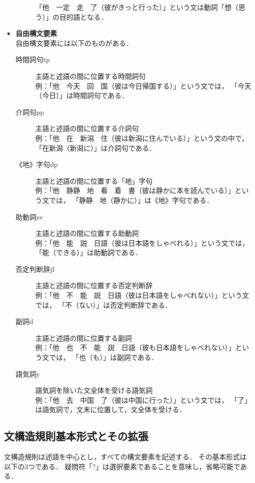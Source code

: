 \documentclass[japanese]{jnlp_1.3a}
\begin{document}
\begin{itemize}
\begin{description}
    「他　一定　走　了（彼がきっと行った）」という文は動詞「想（思う）」の目的語となる．
  \end{description}
\item{\bf 自由構文要素}\\
  自由構文要素には以下のものがある．
  \begin{description}
  \item[時間詞句tp]主語と述語の間に位置する時間詞句\\
    例：「他　今天　回　国（彼は今日帰国する）」という文では，
    「今天（今日）」は時間詞句である．
  \item[介詞句pp]主語と述語の間に位置する介詞句\\
    例：「他　在　新潟　住（彼は新潟に住んでいる）」という文の中で，
    「在新潟（新潟に）」は介詞句である．
  \item[《地》字句dp]主語と述語の間に位置する「地」字句\\
    例：「他　静静　地　看　着　書（彼は静かに本を読んでいる）」という文では，
    「静静　地（静かに）」は《地》字句である．
  \item[助動詞zv]主語と述語の間に位置する助動詞\\
    例：「他　能　説　日語（彼は日本語をしゃべれる）」という文では，
    「能（できる）」は助動詞である．
  \item[否定判断辞jf]主語と述語の間に位置する否定判断辞\\
    例：「他　不　能　説　日語（彼は日本語をしゃべれない）」という文では，
    「不（ない）」は否定判断辞である．
  \item[副詞d]主語と述語の間に位置する副詞\\
    例：「他　也　不　能　説　日語（彼も日本語をしゃべれない）」という文では，
    「也（も）」は副詞である．
  \item[語気詞y]語気詞を除いた文全体を受ける語気詞\\
    例：「他　去　中国　了（彼は中国に行った）」という文では，
    「了」は語気詞で，文末に位置して，文全体を受ける．
  \end{description}
\end{itemize}

\subsection{文構造規則基本形式とその拡張}
文構造規則は述語を中心とし，すべての構文要素を記述する．
その基本形式は以下の3つである．
疑問符「?」は選択要素であることを意味し，省略可能である．
\end{document}
